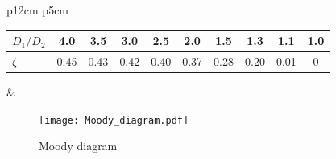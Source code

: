 \begin{tabular}[t]{p{12cm} p{5cm}}
	\begin{tabular}{l c c c c c c c c c}
		$D_1/D_2$ & 4.0 & 3.5 & 3.0 & 2.5 & 2.0 & 1.5 & 1.3 & 1.1 & 1.0   \\ 
		\hline
		$\zeta$    & 0.45    & 0.43    & 0.42      & 0.40    & 0.37     & 0.28 & 0.20 & 0.01 & 0 \\
	\end{tabular}
	&
	\vfill
\end{tabular}

\begin{figure}[ht]
	\caption{Moody diagram}
	\label{fig:Moody diagram}
	\centering
	\texttt{[image: Moody\_diagram.pdf]}
\end{figure}